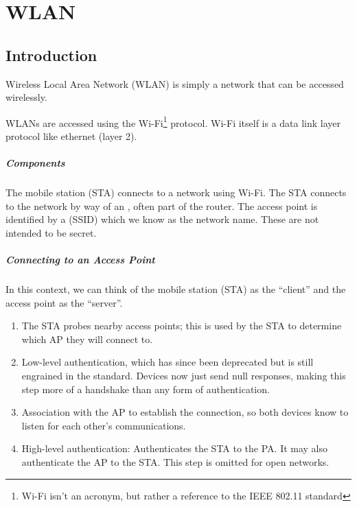 \chapter{WLAN}
\section{Introduction}
\begin{dfnbox}{Wireless Local Area Network (WLAN)}{}
     is simply a network that can be accessed wirelessly.
\end{dfnbox}

WLANs are accessed using the Wi-Fi\footnote{Wi-Fi isn't an acronym, but rather a reference to the IEEE 802.11 standard} protocol. Wi-Fi itself is a data link layer protocol like ethernet (layer 2).

\paragraph{Components}
The mobile station (STA) connects to a network using Wi-Fi. The STA connects to the network by way of an , often part of the router. The access point is identified by a  (SSID) which we know as the network name. These are not intended to be secret.

\paragraph{Connecting to an Access Point}
In this context, we can think of the mobile station (STA) as the ``client'' and the access point as the ``server''.
\begin{enumerate}
    \item The STA probes nearby access points; this is used by the STA to determine which AP they will connect to.
    \item Low-level authentication, which has since been deprecated but is still engrained in the standard. Devices now just send null responses, making this step more of a handshake than any form of authentication.
    \item Association with the AP to establish the connection, so both devices know to listen for each other's communications.
    \item High-level authentication: Authenticates the STA to the PA. It may also authenticate the AP to the STA. This step is omitted for open networks.
\end{enumerate}

